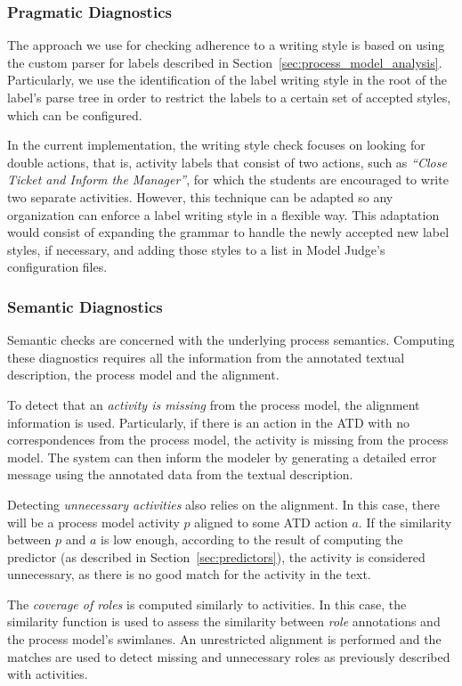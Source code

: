 \subsubsection*{Pragmatic Diagnostics}
The approach we use for checking adherence to a writing style is based on
using the custom  parser for labels described in
Section~\ref{sec:process_model_analysis}. Particularly, we use the
identification of the label writing style in the root of the label's parse tree
in order to restrict the labels to a certain set of accepted styles, which can
be configured.

In the current implementation, the writing style check focuses on looking
for double actions, that is, activity labels that consist of two actions, such
as \textit{``Close Ticket and Inform the Manager''}, for which the students are
encouraged to write two separate activities. However, this technique can be
adapted so any organization can enforce a label writing style in a flexible way.
This adaptation would consist of expanding the grammar to handle the newly
accepted new label styles, if necessary, and adding those styles to a list in
Model Judge's configuration files.

\subsubsection*{Semantic Diagnostics}
Semantic checks are concerned with the underlying process
semantics. Computing these diagnostics requires all the information from the
annotated textual description, the process model and the alignment.

To detect that an \emph{activity is missing} from the process model, the alignment
information is used. Particularly, if there is an action in the ATD with no
correspondences from the process model, the activity is missing from the process
model. The system can then inform the modeler by generating a detailed error
message using the annotated data from the textual description.

Detecting \emph{unnecessary activities} also relies on the alignment. In this case,
there will be a process model activity $p$ aligned to some ATD action $a$. If the
similarity between $p$ and $a$ is low enough, according to the result of
computing the predictor (as described in Section~\ref{sec:predictors}), the
activity is considered unnecessary, as there is no good match for the activity
in the text.

The \emph{coverage of roles} is computed similarly to activities. In this case, the
similarity function is used to assess the similarity between \emph{role}
annotations and the process model's swimlanes. An unrestricted alignment is
performed and the matches are used to detect missing and unnecessary roles as
previously described with activities.

